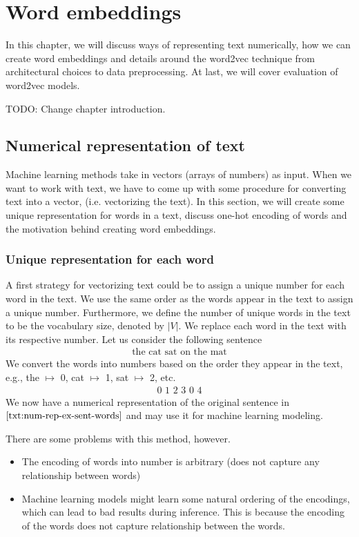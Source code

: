 \chapter{Word embeddings}
In this chapter, we will discuss ways of representing text numerically, how we can create word embeddings and details around the word2vec technique from architectural choices to data preprocessing. At last, we will cover evaluation of word2vec models.

TODO: Change chapter introduction.

\section{Numerical representation of text}
Machine learning methods take in vectors (arrays of numbers) as input. When we want to work with text, we have to come up with some procedure for converting text into a vector, (i.e. vectorizing the text).
In this section, we will create some unique representation for words in a text, discuss one-hot encoding of words and the motivation behind creating word embeddings.

\subsection{Unique representation for each word}
\label{unique-representation-for-each-word}
A first strategy for vectorizing text could be to assign a unique number for each word in the text. We use the same order as the words appear in the text to assign a unique number. Furthermore, we define the number of unique words in the text to be the vocabulary size, denoted by $|V|$. We replace each word in the text with its respective number. Let us consider the following sentence
\begin{align}
    \text{the cat sat on the mat} \label{txt:num-rep-ex-sent-words}
\end{align}
\noindent
We convert the words into numbers based on the order they appear in the text, e.g., the $\mapsto$ 0, cat $\mapsto$ 1, sat $\mapsto$ 2, etc.
\begin{align}
    \text{0 1 2 3 0 4} \label{txt:num-rep-ex-sent}
\end{align}
We now have a numerical representation of the original sentence in $\ref{txt:num-rep-ex-sent-words}$ and may use it for machine learning modeling.

\noindent
There are some problems with this method, however.
\begin{itemize}
    \item The encoding of words into number is arbitrary (does not capture any relationship between words)
    \item Machine learning models might learn some natural ordering of the encodings, which can lead to bad results during inference. This is because the encoding of the words does not capture relationship between the words.
\end{itemize}

